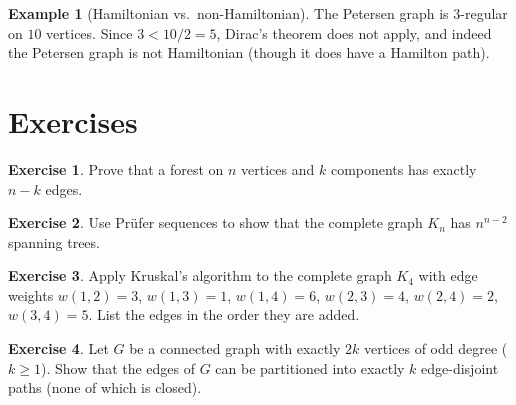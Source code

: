 \documentclass[12pt,a4paper,openany]{book}
\theoremstyle{definition}
\newtheorem{example}[definition]{Example}
\newtheorem{exercise}{Exercise}[chapter]
\theoremstyle{plain}
\theoremstyle{remark}
\begin{document}
\begin{example}[Hamiltonian vs.\ non-Hamiltonian]
\label{ex:hamilton}
The Petersen graph is $3$-regular on $10$ vertices.  Since $3<10/2=5$,
Dirac's theorem does not apply, and indeed the Petersen graph is not
Hamiltonian (though it does have a Hamilton path).

\begin{center}
\end{center}
\end{example}


\section{Exercises}
\label{sec:ex-ch9}

\begin{exercise}
\label{exo:tree-edges}
Prove that a forest on $n$ vertices and $k$ components has exactly
$n-k$ edges.
\end{exercise}

\begin{exercise}
\label{exo:prufer}
Use Pr\"ufer sequences to show that the complete graph $K_n$ has
$n^{n-2}$ spanning trees.
\end{exercise}

\begin{exercise}
\label{exo:kruskal-run}
Apply Kruskal's algorithm to the complete graph $K_4$ with edge weights
$w(1,2)=3$, $w(1,3)=1$, $w(1,4)=6$, $w(2,3)=4$, $w(2,4)=2$,
$w(3,4)=5$.  List the edges in the order they are added.
\end{exercise}

\begin{exercise}
\label{exo:euler-degree}
Let $G$ be a connected graph with exactly $2k$ vertices of odd degree
($k\ge 1$).  Show that the edges of $G$ can be partitioned into exactly
$k$ edge-disjoint paths (none of which is closed).
\end{exercise}
\end{document}
